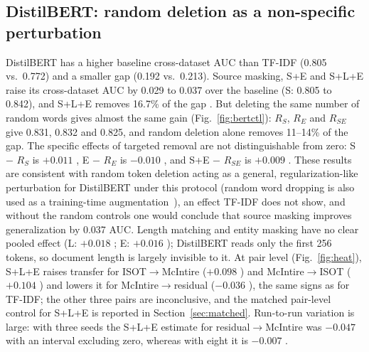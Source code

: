 \subsection{DistilBERT: random deletion as a non-specific perturbation}
\label{sec:bert}
DistilBERT has a higher baseline cross-dataset AUC than TF-IDF (0.805 vs.\ 0.772) and a smaller gap (0.192 vs.\ 0.213). Source masking, S+E and S+L+E raise its cross-dataset AUC by 0.029 to 0.037 over the baseline (S: 0.805 to 0.842), and S+L+E removes 16.7\% of the gap . But deleting the same number of random words gives almost the same gain (Fig.~\ref{fig:bertctl}): $R_S$, $R_E$ and $R_{SE}$ give 0.831, 0.832 and 0.825, and random deletion alone removes 11--14\% of the gap. The specific effects of targeted removal are not distinguishable from zero: S $-$ $R_S$ is $+0.011$ , E $-$ $R_E$ is $-0.010$ , and S+E $-$ $R_{SE}$ is $+0.009$ . These results are consistent with random token deletion acting as a general, regularization-like perturbation for DistilBERT under this protocol (random word dropping is also used as a training-time augmentation~\cite{zhu2022endef}), an effect TF-IDF does not show, and without the random controls one would conclude that source masking improves generalization by 0.037 AUC. Length matching and entity masking have no clear pooled effect (L: $+0.018$ ; E: $+0.016$ ); DistilBERT reads only the first 256 tokens, so document length is largely invisible to it. At pair level (Fig.~\ref{fig:heat}), S+L+E raises transfer for ISOT$\rightarrow$McIntire ($+0.098$ ) and McIntire$\rightarrow$ISOT ($+0.104$ ) and lowers it for McIntire$\rightarrow$residual ($-0.036$ ), the same signs as for TF-IDF; the other three pairs are inconclusive, and the matched pair-level control for S+L+E is reported in Section~\ref{sec:matched}. Run-to-run variation is large: with three seeds the S+L+E estimate for residual$\rightarrow$McIntire was $-0.047$ with an interval excluding zero, whereas with eight it is $-0.007$ .

